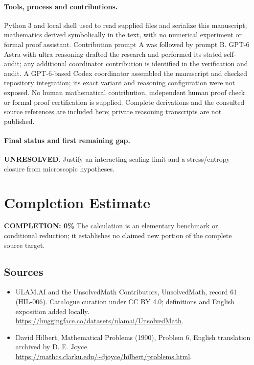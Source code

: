 \documentclass[11pt]{article}
\begin{document}
\paragraph{Tools, process and contributions.}
Python 3 and local shell used to read supplied files and serialize this manuscript; mathematics derived symbolically in the text, with no numerical experiment or formal proof assistant. Contribution prompt A was followed by prompt B. GPT-6 Astra with ultra reasoning drafted the research and performed its stated self-audit; any additional coordinator contribution is identified in the verification and audit. A GPT-6-based Codex coordinator assembled the manuscript and checked repository integration; its exact variant and reasoning configuration were not exposed. No human mathematical contribution, independent human proof check or formal proof certification is supplied. Complete derivations and the consulted source references are included here; private reasoning transcripts are not published.

\paragraph{Final status and first remaining gap.}
\textbf{UNRESOLVED}. Justify an interacting scaling limit and a stress/entropy closure from microscopic hypotheses.

\section{Completion Estimate}
\noindent\textbf{COMPLETION: 0\%}
The calculation is an elementary benchmark or conditional reduction; it establishes no claimed new portion of the complete source target.

\subsection{Sources}
\begin{itemize}
\item[\hypertarget{source:61:1}{S1}] ULAM.AI and the UnsolvedMath Contributors, UnsolvedMath, record 61 (HIL-006). Catalogue curation under CC BY 4.0; definitions and English exposition added locally.
\url{https://huggingface.co/datasets/ulamai/UnsolvedMath}.
\item[\hypertarget{source:61:2}{S2}] David Hilbert, Mathematical Problems (1900), Problem 6, English translation archived by D. E. Joyce.
\url{https://mathcs.clarku.edu/~djoyce/hilbert/problems.html}.
\end{itemize}
\label{end:61}
\end{document}
